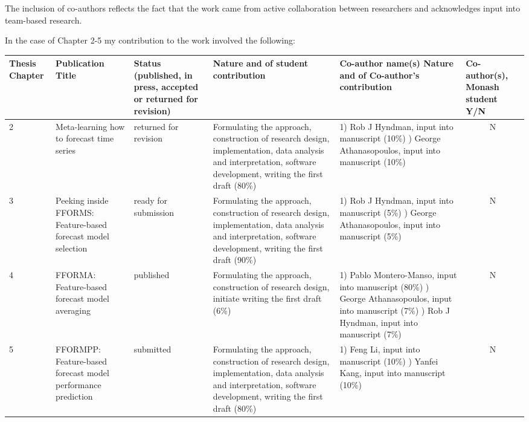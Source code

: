 \documentclass{monashthesis}
\begin{document}
The inclusion of co-authors reflects the fact that the work came from active collaboration between researchers and acknowledges input into team-based research.

In the case of Chapter 2-5 my contribution to the work involved the following:

\begin{table}
\centering\footnotesize\tabcolsep=0.12cm
\begin{tabular}{|p{1cm}|p{2cm}|p{1.5cm}|p{3.5cm}|p{3.5cm}|p{1.5cm}|}
\hline
\rowcolor[gray]{.1}  \textbf{\color{white}Thesis Chapter}  & \textbf{\color{white}Publication Title}  & \textbf{\color{white}Status (published, in press, accepted or returned for revision)}  &  \textbf{\color{white}Nature and} \color{white}{\%} \textbf{\color{white}of student contribution} & \textbf{\color{white}Co-author name(s) Nature and} \color{white}{\%} \textbf{\color{white}of Co-author’s contribution} &  \textbf{\color{white}Co-author(s), Monash student Y/N} \\ \hline
2 & Meta-learning how to forecast time series  & returned for revision  & Formulating the approach, construction of research design, implementation, data analysis and interpretation, software development, writing the first draft (80\%)   & 1) Rob J Hyndman, input into manuscript (10\%) \newline 2) George Athanasopoulos, input into manuscript (10\%)  & \multicolumn{1}{c|}{N}   \\
\hline
3 & Peeking inside FFORMS: Feature-based forecast model selection  & ready for submission  & Formulating the approach, construction of research design, implementation, data analysis and interpretation, software development, writing the first draft (90\%)   & 1) Rob J Hyndman, input into manuscript (5\%) \newline 2) George Athanasopoulos, input into manuscript (5\%)  & \multicolumn{1}{c|}{N}   \\
\hline
4 & FFORMA: Feature-based forecast model averaging & published  & Formulating the approach, construction of research design, initiate writing the first draft (6\%)   & 1) Pablo Montero-Manso, input into manuscript (80\%) \newline 2) George Athanasopoulos, input into manuscript (7\%) \newline 3) Rob J Hyndman, input into manuscript (7\%)   & \multicolumn{1}{c|}{N}    \\
\hline
5 & FFORMPP: Feature-based forecast model performance prediction & submitted  & Formulating the approach, construction of research design, implementation, data analysis and interpretation, software development, writing the first draft (80\%)   & 1) Feng Li, input into manuscript (10\%)  \newline 2) Yanfei Kang, input into manuscript (10\%)   & \multicolumn{1}{c|}{N}   \\
\hline
\end{tabular}
\end{table}
\end{document}
